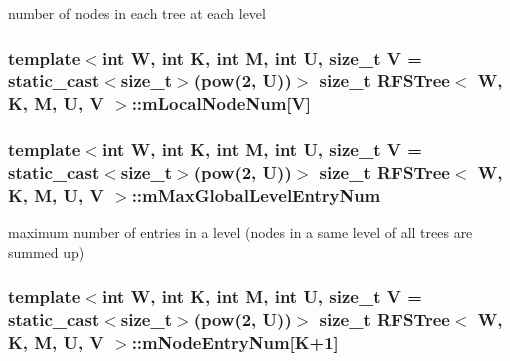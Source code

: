 number of nodes in each tree at each level 

\hypertarget{classRFSTree_ab92e7b50a603831c0d2f054aab3d19dd}{
\subsubsection[{m\-Local\-Node\-Num}]{\setlength{\rightskip}{0pt plus 5cm}template$<$int W, int K, int M, int U, size\-\_\-t V = static\-\_\-cast$<$size\-\_\-t$>$(pow(2, U))$>$ size\-\_\-t {\bf R\-F\-S\-Tree}$<$ {\bf W}, K, M, U, V $>$\-::m\-Local\-Node\-Num\mbox{[}V\mbox{]}\hspace{0.3cm}{\ttfamily [private]}}}\label{classRFSTree_ab92e7b50a603831c0d2f054aab3d19dd}
\hypertarget{classRFSTree_a844879a59d793f3f94be1b52af8bed6d}{
\subsubsection[{m\-Max\-Global\-Level\-Entry\-Num}]{\setlength{\rightskip}{0pt plus 5cm}template$<$int W, int K, int M, int U, size\-\_\-t V = static\-\_\-cast$<$size\-\_\-t$>$(pow(2, U))$>$ size\-\_\-t {\bf R\-F\-S\-Tree}$<$ {\bf W}, K, M, U, V $>$\-::m\-Max\-Global\-Level\-Entry\-Num\hspace{0.3cm}{\ttfamily [private]}}}\label{classRFSTree_a844879a59d793f3f94be1b52af8bed6d}


maximum number of entries in a level (nodes in a same level of all trees are summed up) 

\hypertarget{classRFSTree_a366b72f13bd85ba5e7a5405cdf8d59d6}{
\subsubsection[{m\-Node\-Entry\-Num}]{\setlength{\rightskip}{0pt plus 5cm}template$<$int W, int K, int M, int U, size\-\_\-t V = static\-\_\-cast$<$size\-\_\-t$>$(pow(2, U))$>$ size\-\_\-t {\bf R\-F\-S\-Tree}$<$ {\bf W}, K, M, U, V $>$\-::m\-Node\-Entry\-Num\mbox{[}K+1\mbox{]}\hspace{0.3cm}{\ttfamily [private]}}}\label{classRFSTree_a366b72f13bd85ba5e7a5405cdf8d59d6}


